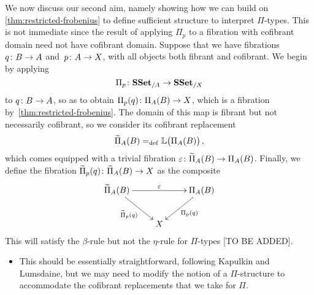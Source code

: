 \documentclass[reqno,10pt,a4paper,oneside,draft]{amsart}
\begin{document}
We now discuss our second aim, namely showing how we can build on \cref{thm:restricted-frobenius} 
to define sufficient structure to interpret $\Pi$-types. This is not immediate since the result of applying $\Pi_p$ to a 
fibration with cofibrant domain need not have cofibrant domain.
 Suppose that we have fibrations 
$q \colon B \to A$ and~$p \colon A \to X$, with
all objects both fibrant and cofibrant. 
We begin by applying 
\[
\Pi_p  \colon \mathbf{SSet}_{/A} \to \mathbf{SSet}_{/X}
\]
to $q \colon B \to A$, so as to obtain $\Pi_p(q) \colon \Pi_A(B) \to X$, which is
a fibration by~\cref{thm:restricted-frobenius}. The domain of this map is fibrant but
not necessarily cofibrant, so we consider its cofibrant replacement 
\[
\widetilde{\Pi}_A(B) =_{\operatorname{def}} \mathbb{L} \big( \Pi_A(B)  \big) \, ,
\]
which comes equipped with a trivial fibration $\varepsilon \colon \widetilde{\Pi}_A(B) \to \Pi_A(B)$.
Finally, we define the fibration $\widetilde{\Pi}_p(q) \colon \widetilde{\Pi}_A(B) \to X$ as 
 the composite
 \[
\xymatrix{
\widetilde{\Pi}_A(B) \ar[rr]^{\varepsilon} \ar[dr]_{\widetilde{\Pi}_p(q) } & & \Pi_A(B) \ar[dl]^{\Pi_p(q)}  \\
 & X &} 
 \]
This will satisfy the $\beta$-rule but not the $\eta$-rule for $\Pi$-types [TO BE ADDED].




\begin{itemize}
\item This should be essentially straightforward, following Kapulkin and Lumsdaine, but we may need to modify the notion of a $\Pi$-structure to accommodate the cofibrant replacements that we take for $\Pi$.
\end{itemize}






\nocite{*}







\end{document}
